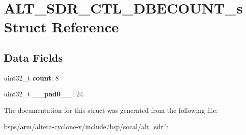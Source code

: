\hypertarget{structALT__SDR__CTL__DBECOUNT__s}{}\section{A\+L\+T\+\_\+\+S\+D\+R\+\_\+\+C\+T\+L\+\_\+\+D\+B\+E\+C\+O\+U\+N\+T\+\_\+s Struct Reference}
\label{structALT__SDR__CTL__DBECOUNT__s}
\subsection*{Data Fields}
\begin{DoxyCompactItemize}
\item 
\mbox{\label{structALT__SDR__CTL__DBECOUNT__s_a785dacb290aa2dcdee36b32586e777b4}} 
uint32\+\_\+t {\bfseries count}\+: 8
\item 
\mbox{\label{structALT__SDR__CTL__DBECOUNT__s_adde751561cec45a0314f3761104fc93d}} 
uint32\+\_\+t {\bfseries \+\_\+\+\_\+pad0\+\_\+\+\_\+}\+: 24
\end{DoxyCompactItemize}


The documentation for this struct was generated from the following file\+:\begin{DoxyCompactItemize}
\item 
bsps/arm/altera-\/cyclone-\/v/include/bsp/socal/\mbox{\hyperlink{alt__sdr_8h}{alt\+\_\+sdr.\+h}}\end{DoxyCompactItemize}
